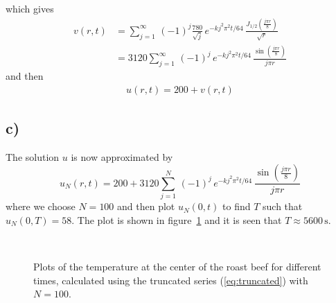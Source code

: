     which gives
    \begin{align*}
        v(r,t) &= \sum_{j=1}^\infty\,(-1)^j\frac{780}{\sqrt{j}}\,e^{-kj^2\pi^2 t/64}\,\frac{J_{1/2}\left(\frac{j\pi r}{8}\right)}{\sqrt{r}}\\
        &= 3120\sum_{j=1}^\infty\,(-1)^j\,e^{-kj^2\pi^2 t/64}\,\frac{\sin\left(\frac{j\pi r}{8}\right)}{j\pi r}
    \end{align*}
    and then
    \begin{align*}
        u(r,t) = 200 + v(r,t)
    \end{align*}

    \subsection*{c)}

    The solution $u$ is now approximated by
    \begin{equation}\label{eq:truncated}
        u_N(r,t) = 200 + 3120\sum_{j=1}^N\,(-1)^j\,e^{-kj^2\pi^2 t/64}\,\frac{\sin\left(\frac{j\pi r}{8}\right)}{j\pi r}
    \end{equation}
    where we choose $N=100$ and then plot $u_N(0,t)$ to find $T$ such that $u_N(0,T)=58$. The plot is shown in figure~\ref{fig:timeplots-u} and it is seen that $T\approx 5600\,\text{s}$.

    \begin{figure}
        \centering
        \mbox{ \quad 
            }
        \caption{Plots of the temperature at the center of the roast beef for different times, calculated using the truncated series (\ref{eq:truncated}) with $N=100$.}
        \label{fig:timeplots-u}
    \end{figure}

